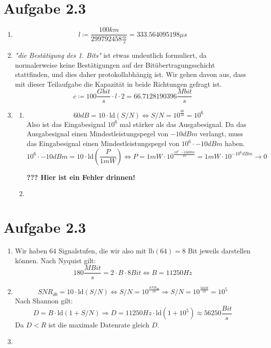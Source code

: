 \documentclass[12pt, a4paper]{article}
\begin{document}
\section*{Aufgabe 2.3}
\begin{enumerate}[label=\alph*)]
	\item	$$l \coloneqq \frac{100 km}{299792458 \frac{m}{s}} = 333.564095198 \mu s$$
	\item	\textit{"die Bestätigung des 1. Bits"} ist etwas undeutlich formuliert, da normalerweise keine Bestätigungen auf der Bitübertragungsschicht stattfinden, und dies daher protokollabhängig ist. Wir gehen davon aus, dass mit dieser Teilaufgabe die Kapazität in beide Richtungen gefragt ist.
			$$c \coloneqq 100 \frac{Gbit}{s} \cdot l \cdot 2 = 66.7128190396 \frac{Mbit}{s}$$
	\item	\begin{enumerate}[label=\roman*)]
				\item	$$60 dB = 10 \cdot \text{ld}(S/N) \Leftrightarrow S/N = 10^{\frac{60}{10}} = 10^6$$
						Also ist das Eingabesignal $10^6$ mal stärker als das Ausgabesignal. Da das Ausgabesignal einen Mindestleistungspegel von $-10 dBm$ verlangt, muss das Eingabesignal einen Mindestleistungspegel von $10^6 \cdot -10 dBm$ haben.
						$$10^6 \cdot -10 dBm = 10 \cdot \text{ld}(\frac{P}{1 mW}) \Leftrightarrow P = 1 mW \cdot 10^{\frac{10^6 \cdot -10 dBm}{10}} = 1 mW \cdot 10^{-10^6 dBm} \rightarrow 0$$
						
						\textbf{??? Hier ist ein Fehler drinnen!}
				\item	
			\end{enumerate}
\end{enumerate}


\newpage


\section*{Aufgabe 2.3}
\begin{enumerate}[label=\alph*)]
	\item	Wir haben $64$ Signalstufen, die wir also mit $\text{lb}(64) = 8$ Bit jeweils darstellen können. Nach Nyquist gilt:
			$$180 \frac{MBit}{s} = 2 \cdot B \cdot 8 Bit \Leftrightarrow B = 11250 Hz$$
	\item	$$SNR_{db} = 10 \cdot \text{ld}(S/N) \Leftrightarrow S/N = 10^{\frac{SNR_{db}}{10}} \Rightarrow S/N = 10^{\frac{50 dB}{10}} = 10^5$$
			Nach Shannon gilt:
			$$D = B \cdot \text{ld}(1 + S/N) \Rightarrow D = 11250 Hz \cdot \text{ld}(1 + 10^5) \approx 56250 \frac{Bit}{s}$$
			Da $D < R$ ist die maximale Datenrate gleich $D$.
	\item	
\end{enumerate}
\end{document}
